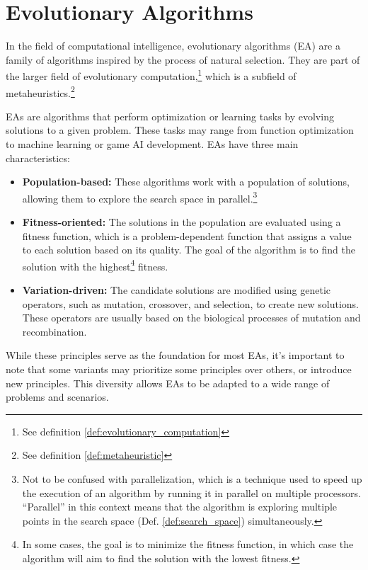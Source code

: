 \section{Evolutionary Algorithms}
\label{sec:evolutionary_algorithms}
  In the field of computational intelligence, evolutionary algorithms (EA) 
  \autocite{yuIntroductionEvolutionaryAlgorithms2010} are a family of algorithms inspired by the 
  process of natural selection.
  They are part of the larger field of evolutionary 
  computation,\footnote{See definition \ref{def:evolutionary_computation}} which is a subfield of 
  metaheuristics.\footnote{See definition \ref{def:metaheuristic}}

  EAs are algorithms that perform optimization or learning tasks by evolving solutions to a given
  problem. These tasks may range from function optimization to machine learning or game AI development.
  EAs have three main characteristics:

  \begin{itemize}
    \item \textbf{Population-based:} These algorithms work with a population of solutions, allowing
      them to explore the search space in parallel.\footnote{
        Not to be confused with parallelization, which is a technique used to speed up the execution
        of an algorithm by running it in parallel on multiple processors.
        \enquote{Parallel} in this context means that the algorithm is exploring multiple points in
        the search space (Def. \ref{def:search_space}) simultaneously.
      }
    \item \textbf{Fitness-oriented:} The solutions in the population are evaluated using a fitness
      function, which is a problem-dependent function that assigns a value to each solution based on its quality.
      The goal of the algorithm is to find the solution with the highest\footnote{
        In some cases, the goal is to minimize the fitness function, in which case the algorithm
        will aim to find the solution with the lowest fitness.
      } fitness.
    \item \textbf{Variation-driven:} The candidate solutions are modified using genetic operators,
      such as mutation, crossover, and selection, to create new solutions.
      These operators are usually based on the biological processes of mutation and recombination.
  \end{itemize}
  
  While these principles serve as the foundation for most EAs, it's important to note that some 
  variants may prioritize some principles over others, or introduce new principles. 
  This diversity allows EAs to be adapted to a wide range of problems and scenarios.
